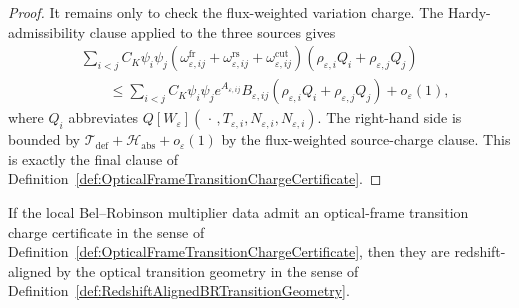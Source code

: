 \begin{proof}
It remains only to check the flux-weighted variation charge.  The Hardy-admissibility clause applied to the three sources gives
\[
\begin{split}
    &\sum_{i<j}
    C_K\psi_i\psi_j
    \left(
        \omega^{\mathrm{fr}}_{\varepsilon,ij}
        +
        \omega^{\mathrm{rs}}_{\varepsilon,ij}
        +
        \omega^{\mathrm{cut}}_{\varepsilon,ij}
    \right)
    \left(
        \rho_{\varepsilon,i}Q_i+\rho_{\varepsilon,j}Q_j
    \right) \\
    &\qquad\le
    \sum_{i<j}
    C_K\psi_i\psi_j
    e^{A_{\varepsilon,ij}}
    B_{\varepsilon,ij}
    \left(
        \rho_{\varepsilon,i}Q_i+\rho_{\varepsilon,j}Q_j
    \right)
    +o_\varepsilon(1),
\end{split}
\]
where $Q_i$ abbreviates
$Q[W_\varepsilon](\,\cdot\,,T_{\varepsilon,i},N_{\varepsilon,i},N_{\varepsilon,i})$.
The right-hand side is bounded by
$\mathcal T_{\mathrm{def}}+\mathcal H_{\mathrm{abs}}+o_\varepsilon(1)$
by the flux-weighted source-charge clause.  This is exactly the final clause of Definition~\ref{def:OpticalFrameTransitionChargeCertificate}.
\end{proof}

\begin{theorem}\label{thm:OpticalFrameChargeGivesRedshiftAlignment}
If the local Bel--Robinson multiplier data admit an optical-frame transition charge certificate in the sense of Definition~\ref{def:OpticalFrameTransitionChargeCertificate}, then they are redshift-aligned by the optical transition geometry in the sense of Definition~\ref{def:RedshiftAlignedBRTransitionGeometry}.
\end{theorem}

